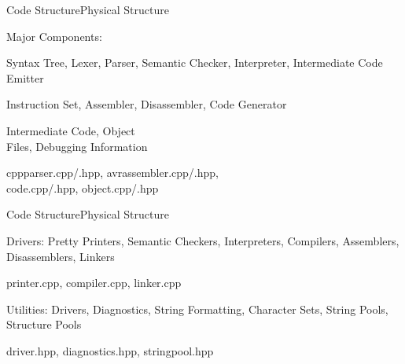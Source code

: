 \begin{frame}{Code Structure}{Physical Structure}
\begin{block}{Major Components:}
\begin{description}
\item[Programming Languages:] Syntax Tree, Lexer, Parser, Semantic Checker, Interpreter, Intermediate Code Emitter
\item[Hardware Architectures:] Instruction Set, Assembler, Disassembler, Code Generator
\item[Abstractions:] Intermediate Code, Object \\ Files, Debugging Information
\end{description}
\begin{description}[Examples:]
\item[Examples:] cppparser.cpp/.hpp, avrassembler.cpp/.hpp, \\ code.cpp/.hpp, object.cpp/.hpp
\end{description}
\end{block}
\end{frame}

\begin{frame}{Code Structure}{Physical Structure}
\begin{block}{Drivers:}
Pretty Printers, Semantic Checkers, Interpreters, Compilers, Assemblers, Disassemblers, Linkers
\begin{description}[Examples:]
\item[Examples:] printer.cpp, compiler.cpp, linker.cpp
\end{description}
\end{block}
\begin{block}{Utilities:}
Drivers, Diagnostics, String Formatting, Character Sets, String Pools, Structure Pools
\begin{description}[Examples:]
\item[Examples:] driver.hpp, diagnostics.hpp, stringpool.hpp
\end{description}
\end{block}
\end{frame}

